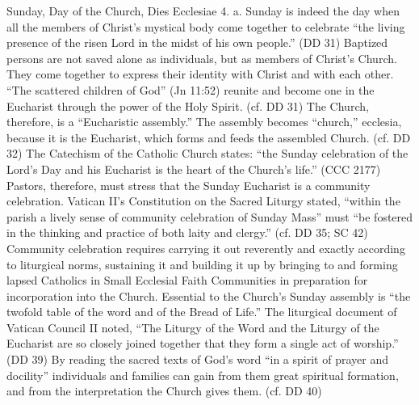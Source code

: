 \documentclass[oneside]{book}
\begin{document}
Sunday, Day of the Church, Dies Ecclesiae
4. a. Sunday is indeed the day when all the members of Christ's mystical body
come together to celebrate ``the living presence of the risen Lord in the midst
of his own people.'' (DD 31) Baptized persons are not saved alone as
individuals, but as members of Christ's Church. They come together to express
their identity with Christ and with each other. ``The scattered children of
God'' (Jn 11:52) reunite and become one in the Eucharist through the power of
the Holy Spirit. (cf. DD 31) The Church, therefore, is a ``Eucharistic
assembly.'' The assembly becomes ``church,'' ecclesia, because it is the
Eucharist, which forms and feeds the assembled Church. (cf. DD 32)
The Catechism of the Catholic Church states: ``the Sunday celebration of the
Lord's Day and his Eucharist is the heart of the Church's life.'' (CCC 2177)
Pastors, therefore, must stress that the Sunday Eucharist is a community
celebration. Vatican II's Constitution on the Sacred Liturgy stated, ``within
the parish a lively sense of community celebration of Sunday Mass'' must ``be
fostered in the thinking and practice of both laity and clergy.'' (cf. DD 35; SC
42) Community celebration requires carrying it out reverently and exactly
according to liturgical norms, sustaining it and building it up by bringing to
and forming lapsed Catholics in Small Ecclesial Faith Communities in preparation
for incorporation into the Church. Essential to the Church's Sunday assembly is
``the twofold table of the word and of the Bread of Life.''
The liturgical document of Vatican Council II noted, ``The Liturgy of the Word
and the Liturgy of the Eucharist are so closely joined together that they form a
single act of worship.'' (DD 39) By reading the sacred texts of God's word ``in
a spirit of prayer and docility'' individuals and families can gain from them
great spiritual formation, and from the interpretation the Church gives
them. (cf. DD 40)
\end{document}
